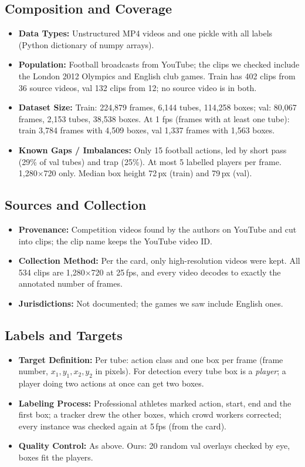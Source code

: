 \documentclass[11pt, a4paper]{article}
\begin{document}
\subsection{Composition and Coverage}
\begin{itemize}
    \item \textbf{Data Types:} Unstructured MP4 videos and one pickle with all labels (Python dictionary of numpy arrays).
    \item \textbf{Population:} Football broadcasts from YouTube; the clips we checked include the London 2012 Olympics and English club games. Train has 402 clips from 36 source videos, val 132 clips from 12; no source video is in both.
    \item \textbf{Dataset Size:} Train: 224,879 frames, 6,144 tubes, 114,258 boxes; val: 80,067 frames, 2,153 tubes, 38,538 boxes. At 1 fps (frames with at least one tube): train 3,784 frames with 4,509 boxes, val 1,337 frames with 1,563 boxes.
    \item \textbf{Known Gaps / Imbalances:} Only 15 football actions, led by short pass (29\% of val tubes) and trap (25\%). At most 5 labelled players per frame. 1,280$\times$720 only. Median box height 72\,px (train) and 79\,px (val).
\end{itemize}

\subsection{Sources and Collection}
\begin{itemize}
    \item \textbf{Provenance:} Competition videos found by the authors on YouTube and cut into clips; the clip name keeps the YouTube video ID.
    \item \textbf{Collection Method:} Per the card, only high-resolution videos were kept. All 534 clips are 1,280$\times$720 at 25\,fps, and every video decodes to exactly the annotated number of frames.
    \item \textbf{Jurisdictions:} Not documented; the games we saw include English ones.
\end{itemize}

\subsection{Labels and Targets}
\begin{itemize}
    \item \textbf{Target Definition:} Per tube: action class and one box per frame (frame number, $x_1, y_1, x_2, y_2$ in pixels). For detection every tube box is a \emph{player}; a player doing two actions at once can get two boxes.
    \item \textbf{Labeling Process:} Professional athletes marked action, start, end and the first box; a tracker drew the other boxes, which crowd workers corrected; every instance was checked again at 5\,fps (from the card).
    \item \textbf{Quality Control:} As above. Ours: 20 random val overlays checked by eye, boxes fit the players.
\end{itemize}
\end{document}
